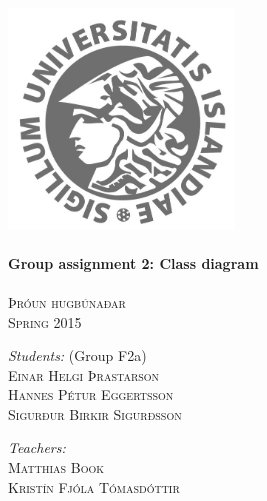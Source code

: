 \documentclass{article}
\begin{document}
\begin{titlepage}
\begin{center}
\textsc{}\\[2cm] 

\includegraphics[width=6cm]{Haskoli_Islands_rett.jpg}\\[0.5cm]

\HRule \\[0.6cm]
{ \huge \bfseries Group assignment 2: Class diagram}\\[0.2cm]
\HRule \\[0.4cm]

\textsc{\normalsize Þróun hugbúnaðar} \\
\textsc{Spring 2015} \\[1.5cm]

\begin{minipage}{0.45\textwidth}
\begin{flushleft} \large
\textit{Students:} (Group F2a)\\
\textsc{Einar Helgi Þrastarson} \\
\textsc{Hannes Pétur Eggertsson} \\
\textsc{Sigurður Birkir Sigurðsson} \\
\end{flushleft}
\end{minipage}
\begin{minipage}{0.45\textwidth}
\begin{flushright} \large
\textit{Teachers:} \\
\textsc{Matthias Book}\\
\textsc{Kristín Fjóla Tómasdóttir}\\
\textsc{ }\\
\end{flushright}
\end{minipage}

\end{center}
\end{titlepage}
\end{document}
